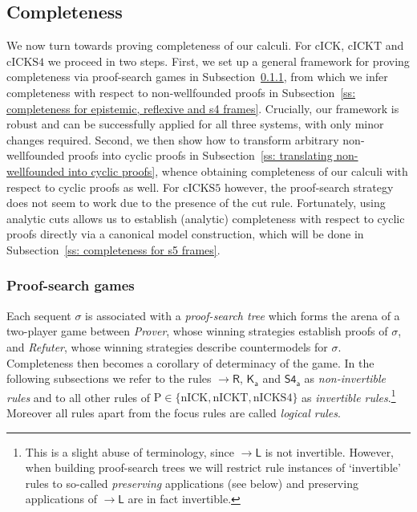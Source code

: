 \documentclass{myifcolog}
\newcommand{\K}{K}
\newcommand{\agi}{a}
\newcommand{\hickp}{\mathrm{P}}
\newcommand{\cick}{\mathrm{cICK}}
\newcommand{\cickt}{\mathrm{cICKT}}
\newcommand{\cicks}{\mathrm{cICKS4}}
\newcommand{\cickss}{\mathrm{cICKS5}}
\newcommand{\nick}{\mathrm{nICK}}
\newcommand{\nickt}{\mathrm{nICKT}}
\newcommand{\nicks}{\mathrm{nICKS4}}
\numberwithin{theorem}{section}
\begin{document}
\subsection{Completeness}\label{c: IM, section completeness of the cyclic calculus cIM}

We now turn towards proving completeness of our calculi. For $\cick$, $\cickt$ and $\cicks$ we proceed in two steps. First, we set up a general framework for proving completeness via proof-search games in Subsection~\ref{ss: proof-search games}, from which we infer completeness with respect to non-wellfounded proofs in Subsection~\ref{ss: completeness for epistemic, reflexive and s4 frames}. Crucially, our framework is robust and can be successfully applied for all three systems, with only minor changes required. Second, we then show how to transform arbitrary non-wellfounded proofs into cyclic proofs in Subsection~\ref{ss: translating non-wellfounded into cyclic proofs}, whence obtaining completeness of our calculi with respect to cyclic proofs as well. For $\cickss$ however, the proof-search strategy does not seem to work due to the presence of the cut rule. Fortunately, using analytic cuts allows us to establish (analytic) completeness with respect to cyclic proofs directly via a canonical model construction, which will be done in Subsection~\ref{ss: completeness for s5 frames}.


\subsubsection{Proof-search games}\label{ss: proof-search games}

Each sequent $\sigma$ is associated with a \emph{proof-search tree} which forms the arena of a two-player game between \emph{Prover}, whose winning strategies establish proofs of $\sigma$, and \emph{Refuter}, whose winning strategies describe countermodels for $\sigma$. 
Completeness then becomes a corollary of determinacy of the game. In the following subsections we refer to the rules $\mathsf{{\rightarrow} R}$, $\mathsf{\K_\agi}$ and $\mathsf{S4_\agi}$ as \emph{non-invertible rules} and to all other rules of $\hickp \in \{\nick, \nickt, \nicks\}$ as \emph{invertible rules}.\footnote{This is a slight abuse of terminology, since $\mathsf{{\rightarrow} L}$ is not invertible. However, when building proof-search trees we will restrict rule instances of `invertible' rules to so-called \emph{preserving} applications (see below) and preserving applications of $\mathsf{{\rightarrow} L}$ are in fact invertible.} Moreover all rules apart from the focus rules are called \emph{logical rules}.
\end{document}
